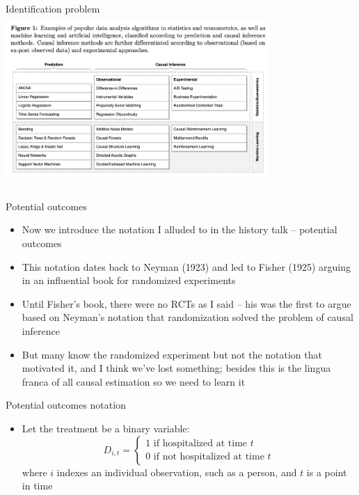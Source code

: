 \documentclass{beamer}
\begin{document}
\begin{frame}{Identification problem}
  \centering
  \includegraphics[scale=0.5,height=6.5cm, width=10cm]{./lecture_includes/prediction_causality.png}
\end{frame}



\begin{frame}{Potential outcomes}

\begin{itemize}

\item Now we introduce the notation I alluded to in the history talk -- potential outcomes
\item This notation dates back to Neyman (1923) and led to Fisher (1925) arguing in an influential book for randomized experiments
\item Until Fisher's book, there were no RCTs as I said -- his was the first to argue based on Neyman's notation that randomization solved the problem of causal inference
\item But many know the randomized experiment but not the notation that motivated it, and I think we've lost something; besides this is the lingua franca of all causal estimation so we need to learn it

\end{itemize}

\end{frame}




\begin{frame}{Potential outcomes notation}

  \begin{itemize}
    \item Let the treatment be a binary variable: $$D_{i,t} =\begin{cases} 1 \text{ if hospitalized at time $t$} \\ 0 \text{ if not hospitalized at time $t$} \end{cases}$$where $i$ indexes an individual observation, such as a person, and $t$ is a point in time
  \end{itemize}
\end{frame}
\end{document}
